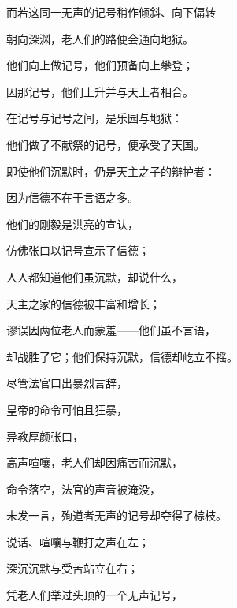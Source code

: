 而若这同一无声的记号稍作倾斜、向下偏转\par

朝向深渊，老人们的路便会通向地狱。\par

他们向上做记号，他们预备向上攀登；\par

因那记号，他们上升并与天上者相合。\par

在记号与记号之间，是乐园与地狱：\par

他们做了不献祭的记号，便承受了天国。\par

即使他们沉默时，仍是天主之子的辩护者：\par

因为信德不在于言语之多。\par

他们的刚毅是洪亮的宣认，\par

仿佛张口以记号宣示了信德；\par

人人都知道他们虽沉默，却说什么，\par

天主之家的信德被丰富和增长；\par

谬误因两位老人而蒙羞——他们虽不言语，\par

却战胜了它；他们保持沉默，信德却屹立不摇。\par

尽管法官口出暴烈言辞，\par

皇帝的命令可怕且狂暴，\par

异教厚颜张口，\par

高声喧嚷，老人们却因痛苦而沉默，\par

命令落空，法官的声音被淹没，\par

未发一言，殉道者无声的记号却夺得了棕枝。\par

说话、喧嚷与鞭打之声在左；\par

深沉沉默与受苦站立在右；\par

凭老人们举过头顶的一个无声记号，\par

